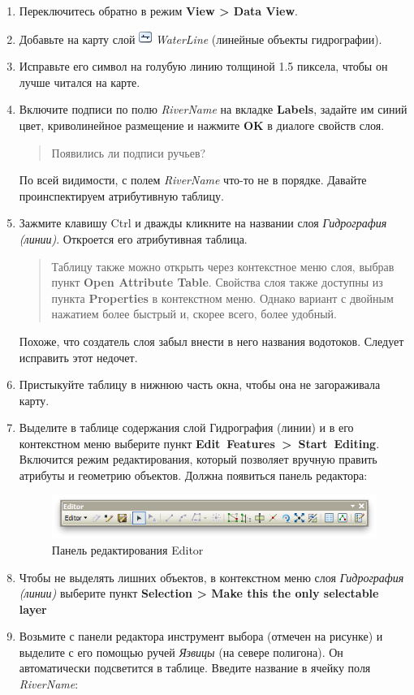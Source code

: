 \documentclass[12pt,]{book}
\begin{document}
\begin{enumerate}
\def\labelenumi{\arabic{enumi}.}
\item
  Переключитесь обратно в режим \textbf{View \textgreater{} Data View}.
\item
  Добавьте на карту слой \includegraphics{images/Ex01/image8.png} \emph{WaterLine} (линейные объекты гидрографии).
\item
  Исправьте его символ на голубую линию толщиной 1.5 пиксела, чтобы он лучше читался на карте.
\item
  Включите подписи по полю \emph{RiverName} на вкладке \textbf{Labels}, задайте им синий цвет, криволинейное размещение и нажмите \textbf{OK} в диалоге свойств слоя.

  \begin{quote}
  Появились ли подписи ручьев?
  \end{quote}

  По всей видимости, с полем \emph{RiverName} что-то не в порядке. Давайте проинспектируем атрибутивную таблицу.
\item
  Зажмите клавишу Ctrl и дважды кликните на названии слоя \emph{Гидрография (линии)}. Откроется его атрибутивная таблица.

  \begin{quote}
  Таблицу также можно открыть через контекстное меню слоя, выбрав пункт \textbf{Open Attribute Table}. Свойства слоя также доступны из пункта \textbf{Properties} в контекстном меню. Однако вариант с двойным нажатием более быстрый и, скорее всего, более удобный.
  \end{quote}

  Похоже, что создатель слоя забыл внести в него названия водотоков. Следует исправить этот недочет.
\item
  Пристыкуйте таблицу в нижнюю часть окна, чтобы она не загораживала карту.
\item
  Выделите в таблице содержания слой Гидрография (линии) и в его контекстном меню выберите пункт \textbf{Edit~Features~\textgreater{}~Start~Editing}. Включится режим редактирования, который позволяет вручную править атрибуты и геометрию объектов. Должна появиться панель редактора:

  \begin{figure}
  \centering
  \includegraphics{images/Ex01/image21.png}
  \caption{Панель редактирования Editor}
  \end{figure}
\item
  Чтобы не выделять лишних объектов, в контекстном меню слоя \emph{Гидрография (линии)} выберите пункт \textbf{Selection \textgreater{} Make this the only selectable layer}
\item
  Возьмите с панели редактора инструмент выбора (отмечен на рисунке) и выделите с его помощью ручей \emph{Язвицы} (на севере полигона). Он автоматически подсветится в таблице. Введите название в ячейку поля \emph{RiverName}:


\end{enumerate}
\end{document}
